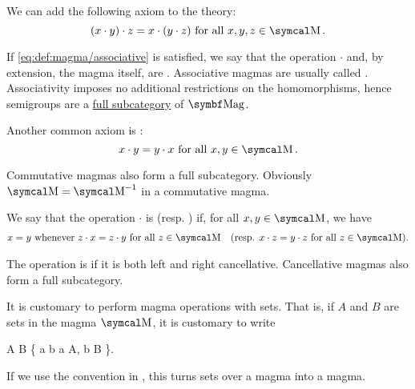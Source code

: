 \begin{definition}
\begin{DefEnum}
     We can add the following axiom to the theory:
    \begin{equation}\label{eq:def:magma/associative}
      (x \cdot y) \cdot z = x \cdot (y \cdot z) \Tforall x, y, z \in \CM.
    \end{equation}

    If \eqref{eq:def:magma/associative} is satisfied, we say that the operation \( \cdot \) and, by extension, the magma itself, are . Associative magmas are usually called . Associativity imposes no additional restrictions on the homomorphisms, hence semigroups are a \hyperref[def:subcategory]{full subcategory} of \( \Cat{Mag} \).

     Another common axiom is :
    \begin{equation}\label{eq:def:magma/commutative}
      x \cdot y = y \cdot x \Tforall x, y \in \CM.
    \end{equation}

    Commutative magmas also form a full subcategory. Obviously \( \CM = \CM^{-1} \) in a commutative magma.

     We say that the operation \( \cdot \) is  (resp. ) if, for all \( x, y \in \CM \), we have
    \begin{align}\label{eq:def:magma/cancellative}
      x = y \Twhenever z \cdot x = z \cdot y \Tforall z \in \CM
      &&
      (\text{resp. } x \cdot z = y \cdot z \Tforall z \in \CM).
    \end{align}

    The operation is  if it is both left and right cancellative. Cancellative magmas also form a full subcategory.
  \end{DefEnum}
\end{definition}

\begin{remark}\label{remark:magma_set_operations}
  It is customary to perform magma operations with sets. That is, if \( A \) and \( B \) are sets in the magma \( \CM \), it is customary to write
  \begin{BreakableAlign*}
    A \cdot B \coloneqq \{ a \cdot b \colon a \in A, b \in B \}.
  \end{BreakableAlign*}

  If we use the convention in , this turns sets over a magma into a magma.
\end{remark}
